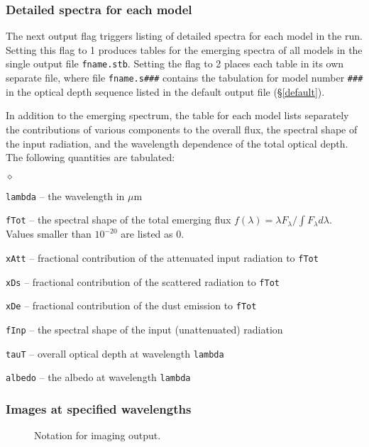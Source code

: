 \documentclass[12pt]{article} \usepackage{epsf}
\newif\ifpdf
\def\Figure#1#2{\centering \leavevmode \ifpdf \pdfimage width #2 #1.png
            \else \tthdump{\epsfclipon \epsfxsize=#2 \epsfbox{#1.ps}}\fi}
\def\E#1{\hbox{$10^{#1}$}}
\def\mic    {\hbox{$\mu$m}}
\def\tthdump#1{#1}      %
\begin{document}
\subsubsection  {Detailed spectra for each model}
\label{fname.s}

The next output flag triggers listing of detailed spectra for each model in the
run.  Setting this flag to 1 produces tables for the emerging spectra of all
models in the single output file {\tt fname.stb}.  Setting the flag to 2 places
each table in its own separate file, where file {\tt fname.s\#\#\#} contains
the tabulation for model number {\tt \#\#\#} in the optical depth sequence
listed in the default output file (\S\ref{default}).

In addition to the emerging spectrum, the table for each model lists separately
the contributions of various components to the overall flux, the spectral shape
of the input radiation, and the wavelength dependence of the total optical
depth. The following quantities are tabulated:
\begin{list}{$\diamond$}{}
\item {\tt lambda} -- the wavelength in \mic
\item
{\tt fTot} -- the spectral shape of the total emerging flux $f(\lambda) =
\lambda F_\lambda/\int\!F_\lambda d\lambda$.  Values smaller than \E{-20} are
listed as 0.
\item{\tt xAtt} -- fractional contribution of the attenuated input radiation
to {\tt fTot}
\item{\tt xDs} -- fractional contribution of the scattered radiation to
{\tt fTot}
\item{\tt xDe} -- fractional contribution of the dust emission to {\tt fTot}
\item{\tt fInp} -- the spectral shape of the input (unattenuated) radiation
\item{\tt tauT} -- overall optical depth at wavelength {\tt lambda}
\item{\tt albedo} -- the albedo at wavelength {\tt lambda}

\end{list}

\subsubsection{Images at specified wavelengths}
\label{imaging}

\begin{figure}
\Figure{Fig1}{0.3\hsize}
\caption{Notation for imaging output.}\label{impact parameter}
\end{figure}
\end{document}
